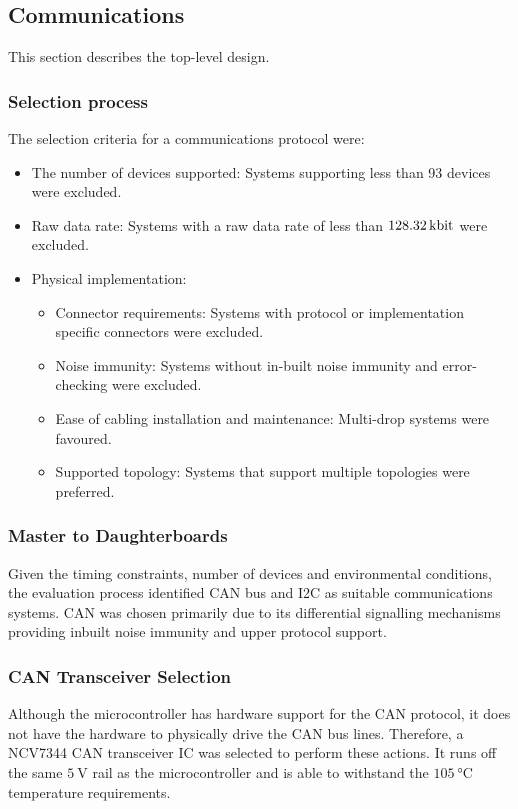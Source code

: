 \subsection{Communications}
\label{sec:communications}

This section describes the top-level design.%

\subsubsection{Selection process}
The selection criteria for a communications protocol were:
\begin{itemize}
	\item The number of devices supported: Systems supporting less than 93 devices were excluded.
	\item Raw data rate: Systems with a raw data rate of less than $\SI{128.32}{\kilo\bit}$ were excluded.
	\item Physical implementation: 
	\begin{itemize}
		\item Connector requirements: Systems with protocol or implementation specific connectors were excluded.
		\item Noise immunity: Systems without in-built noise immunity and error-checking were excluded.
		\item Ease of cabling installation and maintenance: Multi-drop systems were favoured.
		\item Supported topology: Systems that support multiple topologies were preferred.
	\end{itemize}
\end{itemize}

\subsubsection{Master to Daughterboards} 
Given the timing constraints, number of devices and environmental conditions, the evaluation process identified CAN bus and I2C as suitable communications systems.
CAN was chosen primarily due to its differential signalling mechanisms providing inbuilt noise immunity and upper protocol support. 

\subsubsection{CAN Transceiver Selection}
Although the microcontroller has hardware support for the CAN protocol, it does not have the hardware to physically drive the CAN bus lines.
Therefore, a NCV7344 CAN transceiver IC was selected to perform these actions.
It runs off the same $\SI{5}{\volt}$ rail as the microcontroller and is able to withstand the $\SI{105}{\degreeCelsius}$ temperature requirements.

